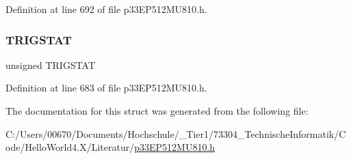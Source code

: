 Definition at line 692 of file p33\+E\+P512\+M\+U810.\+h.

\mbox{\label{structtag_i_c3_c_o_n2_b_i_t_s_ab379549de54ac93ad4aa73686c34cb7c}} 
\subsubsection{\texorpdfstring{T\+R\+I\+G\+S\+T\+AT}{TRIGSTAT}}
{\footnotesize\ttfamily unsigned T\+R\+I\+G\+S\+T\+AT}



Definition at line 683 of file p33\+E\+P512\+M\+U810.\+h.



The documentation for this struct was generated from the following file\+:\begin{DoxyCompactItemize}
\item 
C\+:/\+Users/00670/\+Documents/\+Hochschule/\+\_\+\+Tier1/73304\+\_\+\+Technische\+Informatik/\+Code/\+Hello\+World4.\+X/\+Literatur/\hyperlink{p33_e_p512_m_u810_8h}{p33\+E\+P512\+M\+U810.\+h}\end{DoxyCompactItemize}
